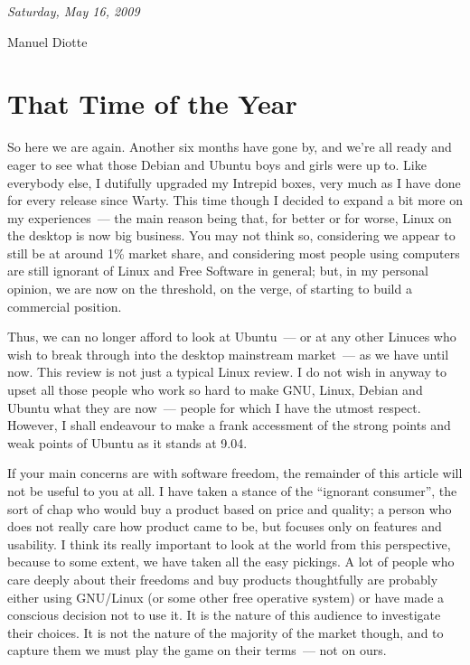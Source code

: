 \documentclass{memoir}
\begin{document}
\begin{flushright}
  \emph{Saturday, May 16, 2009}
\end{flushright}

\begin{epigraphs}
      {Manuel Diotte}
\end{epigraphs}

\section{That Time of the Year}

So here we are again. Another six months have gone by, and we're all
ready and eager to see what those Debian and Ubuntu boys and girls
were up to. Like everybody else, I dutifully upgraded my Intrepid
boxes, very much as I have done for every release since Warty. This
time though I decided to expand a bit more on my experiences~--- the
main reason being that, for better or for worse, Linux on the desktop
is now big business. You may not think so, considering we appear to
still be at around 1\% market share, and considering most people using
computers are still ignorant of Linux and Free Software in general;
but, in my personal opinion, we are now on the threshold, on the
verge, of starting to build a commercial position.

Thus, we can no longer afford to look at Ubuntu~--- or at any other
Linuces who wish to break through into the desktop mainstream
market~--- as we have until now. This review is not just a typical
Linux review. I do not wish in anyway to upset all those people who
work so hard to make GNU, Linux, Debian and Ubuntu what they are
now~--- people for which I have the utmost respect. However, I shall
endeavour to make a frank accessment of the strong points and weak
points of Ubuntu as it stands at 9.04.

If your main concerns are with software freedom, the remainder of this
article will not be useful to you at all. I have taken a stance of the
``ignorant consumer'', the sort of chap who would buy a product based
on price and quality; a person who does not really care how product
came to be, but focuses only on features and usability. I think its
really important to look at the world from this perspective, because
to some extent, we have taken all the easy pickings. A lot of people
who care deeply about their freedoms and buy products thoughtfully are
probably either using GNU/Linux (or some other free operative system)
or have made a conscious decision not to use it. It is the nature of
this audience to investigate their choices. It is not the nature of
the majority of the market though, and to capture them we must play
the game on their terms~--- not on ours.
\end{document}
